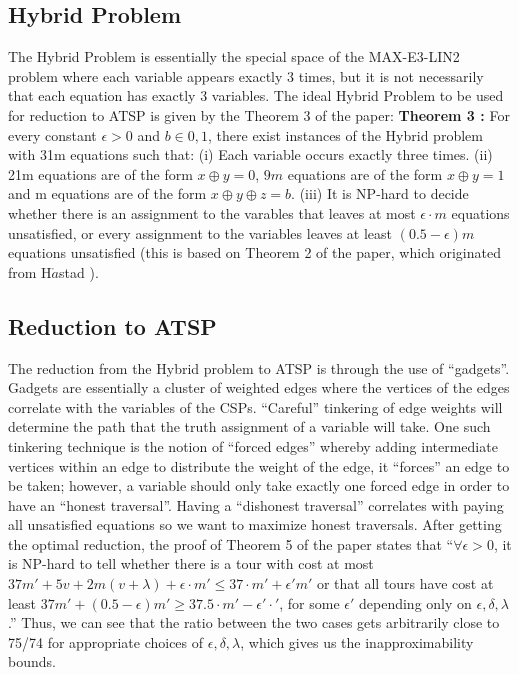 \documentclass[oneside]{projectpaper} %
\begin{document}
\subsection{Hybrid Problem}
The Hybrid Problem is essentially the special space of the MAX-E3-LIN2 problem where each variable appears exactly 3 times, but it is not necessarily that each equation has exactly 3 variables. The ideal Hybrid Problem to be used for reduction to ATSP is given by the Theorem 3 of the paper:
\newline
\newline
\textbf{Theorem 3 \cite{KLS15}:} For every constant $\epsilon > 0$ and $b \in {0,1}$, there exist instances of the Hybrid problem with 31m equations such that: \newline
(i) Each variable occurs exactly three times. \newline
(ii) 21m equations are of the form $x \oplus y = 0$, $9m$ equations are of the form $x \oplus y = 1$ and m equations are of the form $x \oplus y \oplus z = b$. \newline
(iii) It is NP-hard to decide whether there is an assignment to the varables that leaves at most $\epsilon \cdot m$ equations unsatisfied, or every assignment to the variables leaves at least $(0.5 - \epsilon)m$ equations unsatisfied (this is based on Theorem 2 of the paper, which originated from H$\mathring{a}$stad \cite{Has01}).

\subsection{Reduction to ATSP}
The reduction from the Hybrid problem to ATSP is through the use of ``gadgets''. Gadgets are essentially a cluster of weighted edges where the vertices of the edges correlate with the variables of the CSPs. ``Careful'' tinkering of edge weights will determine the path that the truth assignment of a variable will take. One such tinkering technique is the notion of ``forced edges'' whereby adding intermediate vertices within an edge to distribute the weight of the edge, it ``forces'' an edge to be taken; however, a variable should only take exactly one forced edge in order to have an ``honest traversal''. Having a ``dishonest traversal'' correlates with paying all unsatisfied equations so we want to maximize honest traversals. After getting the optimal reduction, the proof of Theorem 5 of the paper states that ``$\forall \epsilon > 0$, it is NP-hard to tell whether there is a tour with cost at most $37m' + 5v + 2m(v + \lambda) + \epsilon \cdot m' \leq 37 \cdot m' + \epsilon'm'$ or that all tours have cost at least $37m' + (0.5 - \epsilon)m' \geq 37.5 \cdot m' - \epsilon' \cdot'$, for some $\epsilon'$ depending only on $\epsilon, \delta, \lambda$ \cite{KLS15}.'' Thus, we can see that the ratio between the two cases gets arbitrarily close to 75/74 for appropriate choices of $\epsilon, \delta, \lambda$, which gives us the inapproximability bounds.
\end{document}
